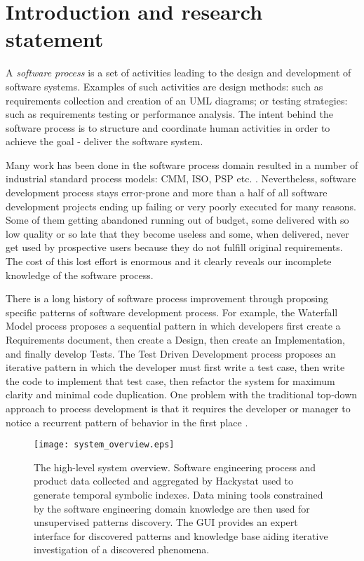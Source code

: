 \chapter{Introduction and research statement}
A \textit{software process} is a set of activities leading to the design and development of software systems. Examples of such activities are design methods: such as requirements collection and creation of an UML diagrams; or testing strategies: such as requirements testing or performance analysis. The intent behind the software process is to structure and coordinate human activities in order to achieve the goal - deliver the software system. 

Many work has been done in the software process domain resulted in a number of industrial standard process models: CMM, ISO, PSP etc. \cite{citeulike:5043104}. Nevertheless, software development process stays error-prone and more than a half of all software development projects ending up failing or very poorly executed for many reasons. Some of them getting abandoned running out of budget, some delivered with so low quality or so late that they become useless and some, when delivered, never get used by prospective users because they do not fulfill original requirements. The cost of this lost effort is enormous and it clearly reveals our incomplete knowledge of the software process.

There is a long history of software process improvement through proposing specific patterns of software development process. For example, the Waterfall Model process proposes a sequential pattern in which developers first create a Requirements document, then create a Design, then create an Implementation, and finally develop Tests. The Test Driven Development process proposes an iterative pattern in which the developer must first write a test case, then write the code to implement that test case, then refactor the system for maximum clarity and minimal code duplication. One problem with the traditional top-down approach to process development is that it requires the developer or manager to notice a recurrent pattern of behavior in the first place \cite{citeulike:5043104}. 

\begin{figure}[tbp]
   \centering
   \texttt{[image: system\_overview.eps]}
   \caption{The high-level system overview. Software engineering process and product data collected and aggregated by Hackystat used to generate temporal symbolic indexes. Data mining tools constrained by the software engineering domain knowledge are then used for unsupervised patterns discovery. The GUI provides an expert interface for discovered patterns and knowledge base aiding iterative investigation of a discovered phenomena.}
   \label{fig:system_overview}
\end{figure}


